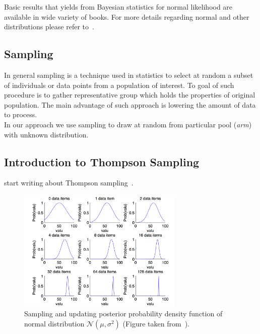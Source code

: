 \documentclass[12pt, a4paper, pdflatex]{report}
\begin{document}
Basic results that yields from Bayesian statistics for normal likelihood are available in wide variety of books. For more details regarding normal and other distributions please refer to~\cite{lynch2007introduction}\cite{gelman2003bayesian}.\\

\subsection{Sampling}
In general sampling is a technique used in statistics to select at random a subset of individuals or data points from a population of interest. To goal of such procedure is to gather representative group which holds the properties of original population. The main advantage of such approach is lowering the amount of data to process.\\
In our approach we use sampling to draw at random from particular pool (\emph{arm}) with unknown distribution.



\subsection{Introduction to Thompson Sampling}
start writing about Thompson sampling~\cite{May:2012:OBS:2503308.2343711}.




\begin{figure}[htbp]
\centering
\includegraphics[width=0.7\textwidth]{graphics/sampling.png}
\begin{tiny}
\caption{Sampling and updating posterior probability density function of normal distribution $\mathcal{N}\left( \mu , \sigma^2 \right)$ (Figure taken from~\cite{Jacobs2008normalnormal}).\label{fig:sampling}}
\end{tiny}
\vspace{1cm}
\end{figure}
\end{document}
